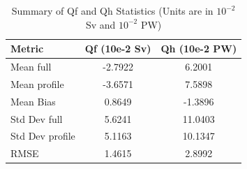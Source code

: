 \begin{table}[h!]
\centering
\caption{Summary of Qf and Qh Statistics (Units are in $10^{-2}$ Sv and $10^{-2}$ PW)}
\label{tab:stats_summary}
\begin{tabular}{|l|c|c|}
\hline
Metric & Qf (10e-2 Sv) & Qh (10e-2 PW) \\
\hline
\hline
Mean full & -2.7922 & 6.2001 \\
Mean profile & -3.6571 & 7.5898 \\
Mean Bias & 0.8649 & -1.3896 \\
\hline
Std Dev full & 5.6241 & 11.0403 \\
Std Dev profile & 5.1163 & 10.1347 \\
RMSE & 1.4615 & 2.8992 \\
\hline
\end{tabular}
\end{table}
